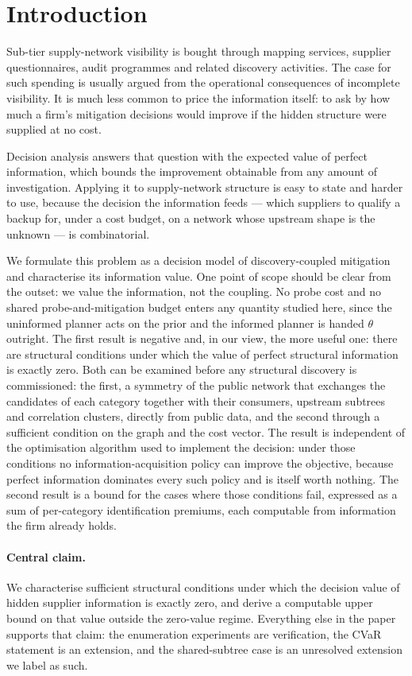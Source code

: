 \documentclass[pdflatex,sn-mathphys-num]{sn-jnl}
\theoremstyle{thmstyleone}
\theoremstyle{thmstyletwo}
\theoremstyle{thmstylethree}
\begin{document}
\section{Introduction}\label{sec:intro}

Sub-tier supply-network visibility is bought through mapping services,
supplier questionnaires, audit programmes and related discovery activities.
The case for such spending is usually argued from the operational
consequences of incomplete visibility. It is much
less common to price the information itself: to ask by how much a firm's
mitigation decisions would improve if the hidden structure were supplied at
no cost.

Decision analysis answers that question with the expected value of perfect
information, which bounds the improvement obtainable from any amount of
investigation. Applying it to supply-network structure is easy to state and
harder to use, because the decision the information feeds --- which
suppliers to qualify a backup for, under a cost budget, on a network whose
upstream shape is the unknown --- is combinatorial.

We formulate this problem as a decision model of discovery-coupled
mitigation and characterise its information value. One point of scope should
be clear from the outset: we value the information, not the coupling. No
probe cost and no shared probe-and-mitigation budget enters any quantity
studied here, since the uninformed planner acts on the prior and the
informed planner is handed $\theta$ outright. The first result is
negative and, in our view, the more useful one: there are structural
conditions under which the value of perfect structural information is exactly
zero. Both can be examined before any structural discovery is commissioned: the
first, a symmetry of the public network that exchanges the candidates of each
category together with their consumers, upstream subtrees and correlation
clusters, directly from public data, and the second through a sufficient condition on the graph
and the cost vector. The result is independent of
the optimisation algorithm used to implement the decision: under those
conditions no information-acquisition policy can improve the objective,
because perfect information dominates every such policy and is itself worth
nothing. The second result is a bound for the cases where those conditions
fail, expressed as a sum of per-category identification premiums, each
computable from information the firm already holds.

\paragraph{Central claim.} We characterise sufficient structural conditions
under which the decision value of hidden supplier information is exactly
zero, and derive a computable upper bound on that value outside the
zero-value regime. Everything else in the paper supports that claim: the
enumeration experiments are verification, the CVaR statement is an
extension, and the shared-subtree case is an unresolved extension we label as
such.
\end{document}
